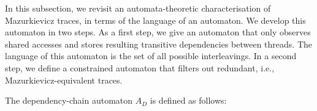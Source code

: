 \documentclass[envcountsame]{llncs}%
\begin{document}
In this subsection, we revisit an automata-theoretic characterisation
of Mazurkievicz traces, in terms of the language of an automaton.
%
We develop this automaton in two steps.
As a first step, we give an automaton that only observes
shared accesses and stores resulting transitive dependencies
between threads.
The language of this automaton is the set of all possible interleavings.
%
In a second step, we define a constrained automaton that 
filters out redundant, i.e., Mazurkievicz-equivalent traces.
%
\begin{definition}

%

The dependency-chain automaton $A_D$ is defined as follows:
%
\begin{itemize}


\end{itemize}
\end{definition}
\end{document}
